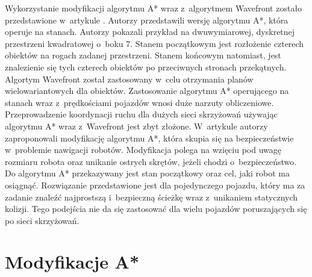 \newline
\indent
Wykorzystanie modyfikacji algorytmu A* wraz z~algorytmem Wavefront zostało przedstawione w~artykule \cite{wojnicki2015robust}. Autorzy przedstawili wersję algorytmu A*, która operuje na stanach. Autorzy pokazali przykład na dwuwymiarowej, dyskretnej przestrzeni kwadratowej o~boku 7. Stanem początkowym jest rozłożenie czterech obiektów na rogach zadanej przestrzeni. Stanem końcowym natomiast, jest znalezienie się tych czterech obiektów po przeciwnych stronach przekątnych. Algortym Wavefront został zastosowany w~celu otrzymania planów wielowariantowych dla obiektów. Zastosowanie algorytmu A* operującego na stanach wraz z~prędkościami pojazdów wnosi duże narzuty obliczeniowe. Przeprowadzenie koordynacji ruchu dla dużych sieci skrzyżowań używając algorytmu A* wraz z~Wavefront jest zbyt złożone.
\newline
\indent
W~artykule \cite{elhalawany2013modified} autorzy zaproponowali modyfikację algorytmu A*, która skupia się na bezpieczeństwie w~problemie nawigacji robotów. Modyfikacja polega na wzięciu pod uwagę rozmiaru robota oraz unikanie ostrych skrętów, jeżeli chodzi o~bezpieczeństwo. Do algorytmu A* przekazywany jest stan początkowy oraz cel, jaki robot ma osiągnąć. Rozwiązanie przedstawione jest dla pojedynczego pojazdu, który ma za zadanie znaleźć najprostszą i~bezpieczną ścieżkę wraz z~unikaniem statycznych kolizji. Tego podejścia nie da się zastosować dla wielu pojazdów poruszających się po sieci skrzyżowań.

\section{Modyfikacje A*}

